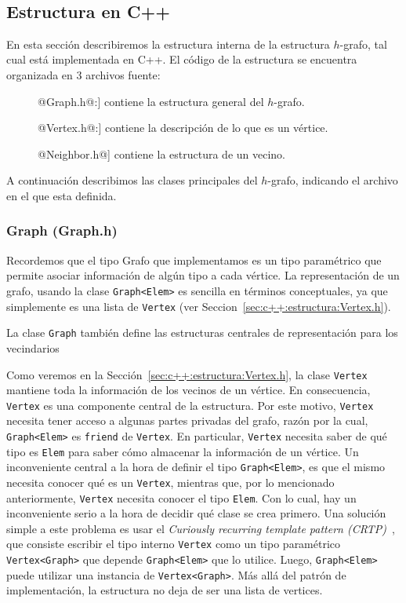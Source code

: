 \documentclass[a4paper,12pt]{article}
\makeatletter
\newcommand{\Code}[1]{\lstinline[basicstyle={\tt}]@#1@}
\makeatother
\begin{document}
\



\subsection{Estructura en C++}
\label{sec:c++:estructura}

En esta sección describiremos la estructura interna de la estructura $h$-grafo, tal cual está implementada en C++.  El código de la estructura se encuentra organizada en 3 archivos fuente:
\begin{description}
  \item[\Code{Graph.h}:] contiene la estructura general del $h$-grafo.
  \item[\Code{Vertex.h}:] contiene la descripción de lo que es un vértice.
  \item[\Code{Neighbor.h}] contiene la estructura de un vecino.
\end{description}
A continuación describimos las clases principales del $h$-grafo, indicando el archivo en el que esta definida.

\subsubsection{Graph (Graph.h)}
\label{sec:c++:estructura:Graph.h}

Recordemos que el tipo Grafo que implementamos es un tipo paramétrico que permite asociar información de algún tipo a cada vértice.  La representación de un grafo, usando la clase \Code{Graph<Elem>} es sencilla en términos conceptuales, ya que simplemente es una lista de \Code{Vertex} (ver Seccion~\ref{sec:c++:estructura:Vertex.h}).  

La clase \Code{Graph} también define las estructuras centrales de representación para los vecindarios


Como veremos en la Sección~\ref{sec:c++:estructura:Vertex.h}, la clase \Code{Vertex} mantiene toda la información de los vecinos de un vértice.  En consecuencia, \Code{Vertex} es una componente central de la estructura.  Por este motivo, \Code{Vertex} necesita tener acceso a algunas partes privadas del grafo, razón por la cual, \Code{Graph<Elem>} es \Code{friend} de \Code{Vertex}.  En particular, \Code{Vertex} necesita saber de qué tipo es \Code{Elem} para saber cómo almacenar la información de un vértice.  Un inconveniente central a la hora de definir el tipo \Code{Graph<Elem>}, es que el mismo necesita conocer qué es un \Code{Vertex}, mientras que, por lo mencionado anteriormente, \Code{Vertex} necesita conocer el tipo \Code{Elem}.  Con lo cual, hay un inconveniente serio a la hora de decidir qué clase se crea primero.  Una solución simple a este problema es usar el \emph{Curiously recurring template pattern (CRTP)}~\cite{}, que consiste escribir el tipo interno \Code{Vertex} como un tipo paramétrico \Code{Vertex<Graph>} que depende \Code{Graph<Elem>} que lo utilice.  Luego, \Code{Graph<Elem>} puede utilizar una instancia de \Code{Vertex<Graph>}.  Más allá del patrón de implementación, la estructura no deja de ser una lista de vertices.
\end{document}
